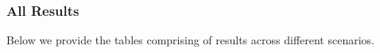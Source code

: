 \subsubsection{All Results}
Below we provide the tables comprising of results across different \livecodebench{} scenarios.


